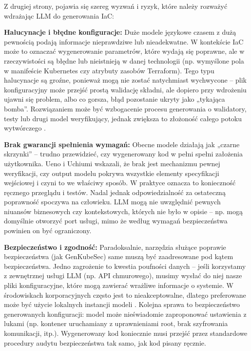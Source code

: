 Z drugiej strony, pojawia się szereg wyzwań i ryzyk, które należy rozważyć wdrażając LLM do generowania IaC:

\textbf{Halucynacje i błędne konfiguracje:} Duże modele językowe czasem z dużą pewnością podają informacje nieprawdziwe lub nieadekwatne. W kontekście IaC może to oznaczać wygenerowanie parametrów, które wydają się poprawne, ale w rzeczywistości są błędne lub nieistnieją w danej technologii (np. wymyślone pola w manifeście Kubernetes czy atrybuty zasobów Terraform). Tego typu halucynacje są groźne, ponieważ mogą nie zostać natychmiast wychwycone – plik konfiguracyjny może przejść prostą walidację składni, ale dopiero przy wdrożeniu ujawni się problem, albo co gorsza, błąd pozostanie ukryty jako „tykająca bomba”. Rozwiązaniem może być wzbogacenie procesu generowania o walidatory, testy lub drugi model weryfikujący, jednak zwiększa to złożoność całego potoku wytwórczego \cite{low_repairing_2024}.

\textbf{Brak gwarancji spełnienia wymagań:} Obecne modele działają jak „czarne skrzynki” – trudno przewidzieć, czy wygenerowany kod w pełni spełni założenia użytkownika. Ueno i Uchiumi \cite{ueno_migrating_2024} wskazali, że brak jest mechanizmu pewnej weryfikacji, czy output modelu pokrywa wszystkie elementy specyfikacji wejściowej i czyni to we właściwy sposób. W praktyce oznacza to konieczność ręcznego przeglądu i testów. Nadal jednak odpowiedzialność za ostateczną poprawność spoczywa na człowieku. LLM mogą nie uwzględnić pewnych niuansów biznesowych czy kontekstowych, których nie było w opisie – np. mogą domyślnie otworzyć port usługi, mimo że według wymagań bezpieczeństwa powinien on być ograniczony.

\textbf{Bezpieczeństwo i zgodność:} Paradoksalnie, narzędzia służące poprawie bezpieczeństwa (jak GenKubeSec) same muszą być zaadresowane pod kątem bezpieczeństwa. Jedno zagrożenie to kwestia poufności danych – jeśli korzystamy z zewnętrznej usługi LLM (np. API chmurowego), musimy wysłać do niej nasze pliki konfiguracyjne, które mogą zawierać wrażliwe informacje o systemie. W środowiskach korporacyjnych często jest to nieakceptowalne, dlatego preferowane może być użycie lokalnych instancji modeli \cite{malul_genkubesec_2024}. Kolejna sprawa to bezpieczeństwo generowanych konfiguracji: model może nieświadomie zaproponować ustawienia z lukami (np. kontener uruchamiany z uprawnieniami root, brak szyfrowania komunikacji, itp.). Wygenerowany kod koniecznie musi przejść przez standardowe procedury audytu bezpieczeństwa tak samo, jak kod pisany ręcznie.

